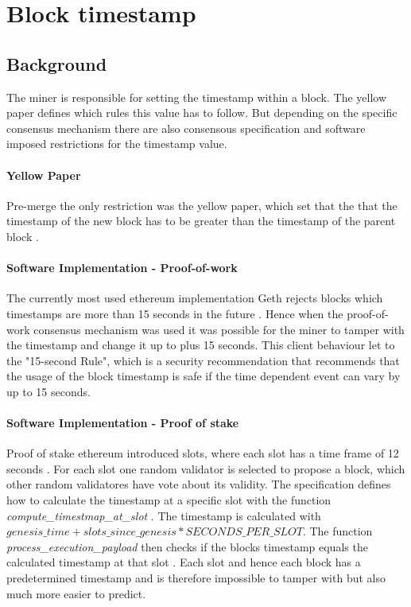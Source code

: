 \section{Block timestamp}

\subsection{Background} 
The miner is responsible for setting the timestamp within a block. The yellow
paper defines which rules this value has to follow. But depending on the
specific consensus mechanism there are also consensous specification and
software imposed restrictions for the timestamp value. 

\paragraph{Yellow Paper}
Pre-merge the only restriction was the yellow paper, which set that the that
the timestamp of the new block has to be greater than the timestamp of the
parent block \cite{ethyellowpaper2023}.

\paragraph{Software Implementation - Proof-of-work}
The currently most used ethereum implementation Geth rejects blocks which
timestamps are more than 15 seconds in the future
\cite{go-ethereum-15-sek-limit}. Hence when the proof-of-work consensus
mechanism was used it was possible for the miner to tamper with the timestamp
and change it up to plus 15 seconds. This client behaviour let to the
"15-second Rule", which is a security recommendation that recommends that the
usage of the block timestamp is safe if the time dependent event can vary by up
to 15 seconds.

\paragraph{Software Implementation - Proof of stake}
Proof of stake ethereum introduced slots, where each slot has a time frame of
12 seconds \cite{seconds-per-slot-mainnet}\cite{seconds-per-slot-mainnet-doc}.
For each slot one random validator is selected to propose a block, which other
random validatores have vote about its validity. The specification defines
how to calculate the timestamp at a specific slot with the function
\textit{compute\_timestmap\_at\_slot} \cite{compute-timestamp-at-slot}. The
timestamp is calculated with $genesis\_time + slots\_since\_genesis *
SECONDS\_PER\_SLOT$. The function \textit{process\_execution\_payload} then
checks if the blocks timestamp equals the calculated timestamp at that slot
\cite{process-execution-payload}. Each slot and hence each block has
a predetermined timestamp and is therefore impossible to tamper with but
also much more easier to predict.

